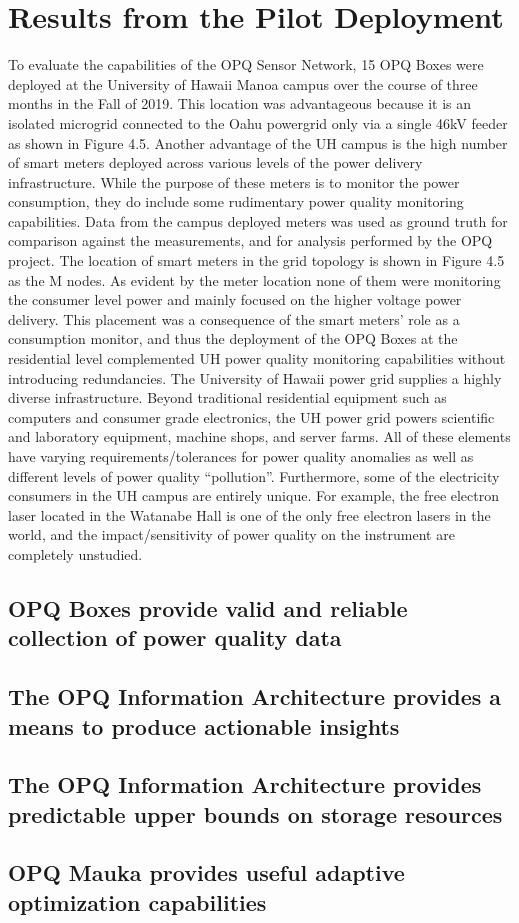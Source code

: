 \section{Results from the Pilot Deployment}
\label{sec:pilot-study}

To evaluate the capabilities of the OPQ Sensor Network, 15 OPQ Boxes were deployed at the University of Hawaii Manoa campus over the course of three months in the Fall of 2019.  This location was advantageous because it is an isolated microgrid connected to the Oahu powergrid only via a single 46kV feeder as shown in Figure 4.5. Another advantage of the UH campus is the high number of smart meters deployed across various levels of the power delivery infrastructure. While the purpose of these meters is to monitor the power consumption, they do include some rudimentary power quality monitoring capabilities. Data from the campus deployed meters was used as ground truth for comparison against the measurements, and for analysis performed by the OPQ project. The location of smart meters in the grid topology is shown in Figure 4.5 as the M nodes. As evident by the meter location none of them were monitoring the consumer level power and mainly focused on the higher voltage power delivery. This placement was a consequence of the smart meters’ role as a consumption monitor, and thus the deployment of the OPQ Boxes at the residential level complemented UH power quality monitoring capabilities without introducing redundancies.
                                                                                                                                    The University of Hawaii power grid supplies a highly diverse infrastructure. Beyond traditional residential equipment such as computers and consumer grade electronics, the UH power grid powers scientific and laboratory equipment, machine shops, and server farms. All of these elements have varying requirements/tolerances for power quality anomalies as well as different levels of power quality “pollution”. Furthermore, some of the electricity consumers in the UH campus are entirely unique. For example, the free electron laser located in the Watanabe Hall is one of the only free electron lasers in the world, and the impact/sensitivity of power quality on the instrument are completely unstudied.

\subsection{OPQ Boxes provide valid and reliable collection of power quality data}

\subsection{The OPQ Information Architecture provides a means to produce actionable insights}

\subsection{The OPQ Information Architecture provides predictable upper bounds on storage resources}

\subsection{OPQ Mauka provides useful adaptive optimization capabilities}




